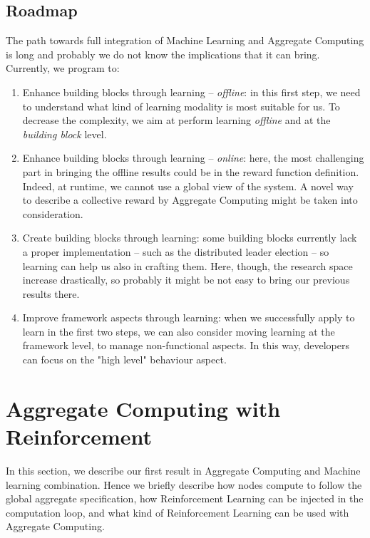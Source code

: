 \documentclass[conference]{IEEEtran}
\begin{document}
\subsection{Roadmap}
The path towards full integration of Machine Learning and Aggregate Computing is long and probably we do not know the implications that it can bring. 
Currently, we program to:
\begin{enumerate}
  \item Enhance building blocks through learning -- \textit{offline}: 
  in this first step, we need to understand what kind of learning modality is most suitable for us. 
  To decrease the complexity, we aim at perform learning \textit{offline} and at the \textit{building block} level.
  \item Enhance building blocks through learning -- \textit{online}:
  here, the most challenging part in bringing the offline results could be in the reward function definition.
  Indeed, at runtime, we cannot use a global view of the system. 
  A novel way to describe a collective reward by Aggregate Computing might be taken into consideration.
  \item Create building blocks through learning: some building blocks currently lack a proper implementation -- 
  such as the distributed leader election -- so learning can help us also in crafting them. 
  Here, though, the research space increase drastically, 
  so probably it might be not easy to bring our previous results there.
  \item Improve framework aspects through learning: 
  when we successfully apply to learn in the first two steps, 
  we can also consider moving learning at the framework level, to manage non-functional aspects. 
  In this way, developers can focus on the "high level" behaviour aspect.
\end{enumerate}

\section{Aggregate Computing with Reinforcement}
In this section, we describe our first result in Aggregate Computing and Machine learning combination.
% 
Hence we briefly describe how nodes compute to follow the global aggregate specification,
 how Reinforcement Learning can be injected in the computation loop,
 and what kind of Reinforcement Learning can be used with Aggregate Computing.
\end{document}
